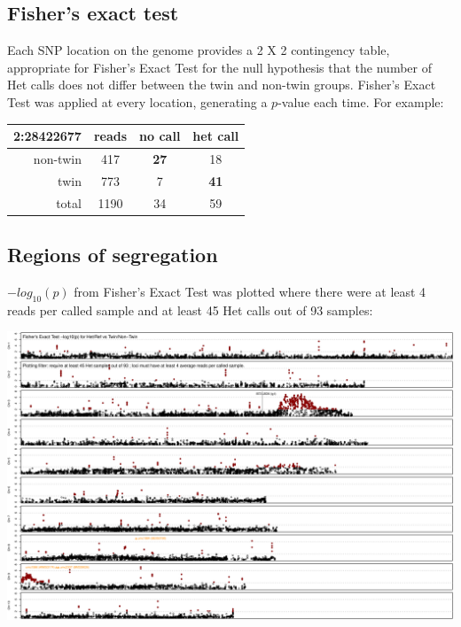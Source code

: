 \documentclass[a0,portrait]{a0poster}
\newlength{\figwidth}
\begin{document}
\begin{multicols}{3}
  \subsection*{Fisher's exact test}

  Each SNP location on the genome provides a 2 X 2 contingency table, appropriate for Fisher's Exact Test
  for the null hypothesis that the number of Het calls does not differ between the twin and non-twin groups.
  Fisher's Exact Test was applied at every location, generating a $p$-value each time. For example:

  \begin{center}
    \begin{tabular}{|r|c||c|c|}
      \hline
      \textbf{2:28422677} & reads & no call & het call \\
      \hline
      \hline
      non-twin   & 417   & \textbf{27} & 18 \\
      \hline
      twin       & 773   & 7  & \textbf{41} \\
      \hline
      \hline
      total      & 1190  & 34 & 59 \\
      \hline
    \end{tabular}
  \end{center}


  \subsection*{Regions of segregation}

  $-log_{10}(p)$ from Fisher's Exact Test was plotted where there were at least 4 reads per called sample and at least 45 Het calls out of 93 samples:
  
  \begin{center}
    \includegraphics[width=\figwidth]{Fisher-Het-45}
  \end{center}


\end{multicols}
\end{document}
